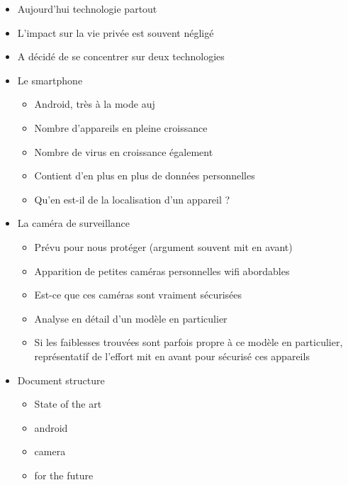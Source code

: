\begin{itemize}
\item Aujourd'hui technologie partout
\item L'impact sur la vie privée est souvent négligé
\item A décidé de se concentrer sur deux technologies
\item Le smartphone
  \begin{itemize}
  \item Android, très à la mode auj
  \item Nombre d'appareils en pleine croissance
  \item Nombre de virus en croissance également
  \item Contient d'en plus en plus de données personnelles
  \item Qu'en est-il de la localisation d'un appareil ?
  \end{itemize}
\item La caméra de surveillance
  \begin{itemize}
  \item Prévu pour nous protéger (argument souvent mit en avant)
  \item Apparition de petites caméras personnelles wifi abordables
  \item Est-ce que ces caméras sont vraiment sécurisées
  \item Analyse en détail d'un modèle en particulier
  \item Si les faiblesses trouvées sont parfois propre à ce modèle en particulier, représentatif de l'effort mit en avant pour sécurisé ces appareils
  \end{itemize}
\item Document structure
  \begin{itemize}
  \item State of the art
  \item android
  \item camera
  \item for the future
  \end{itemize}
\end{itemize}